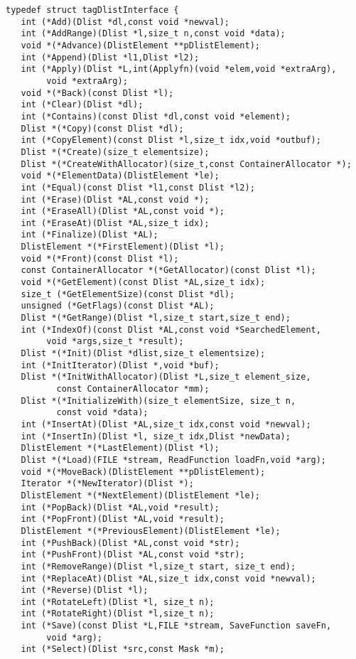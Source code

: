 \begin{verbatim}
typedef struct tagDlistInterface {
   int (*Add)(Dlist *dl,const void *newval);
   int (*AddRange)(Dlist *l,size_t n,const void *data);
   void *(*Advance)(DlistElement **pDlistElement);
   int (*Append)(Dlist *l1,Dlist *l2);
   int (*Apply)(Dlist *L,int(Applyfn)(void *elem,void *extraArg),
        void *extraArg);
   void *(*Back)(const Dlist *l);
   int (*Clear)(Dlist *dl);
   int (*Contains)(const Dlist *dl,const void *element);
   Dlist *(*Copy)(const Dlist *dl);
   int (*CopyElement)(const Dlist *l,size_t idx,void *outbuf);
   Dlist *(*Create)(size_t elementsize);
   Dlist *(*CreateWithAllocator)(size_t,const ContainerAllocator *);
   void *(*ElementData)(DlistElement *le);
   int (*Equal)(const Dlist *l1,const Dlist *l2);
   int (*Erase)(Dlist *AL,const void *);
   int (*EraseAll)(Dlist *AL,const void *);
   int (*EraseAt)(Dlist *AL,size_t idx);
   int (*Finalize)(Dlist *AL);
   DlistElement *(*FirstElement)(Dlist *l);
   void *(*Front)(const Dlist *l);
   const ContainerAllocator *(*GetAllocator)(const Dlist *l);
   void *(*GetElement)(const Dlist *AL,size_t idx);
   size_t (*GetElementSize)(const Dlist *dl);
   unsigned (*GetFlags)(const Dlist *AL);
   Dlist *(*GetRange)(Dlist *l,size_t start,size_t end);
   int (*IndexOf)(const Dlist *AL,const void *SearchedElement,
        void *args,size_t *result);
   Dlist *(*Init)(Dlist *dlist,size_t elementsize);
   int (*InitIterator)(Dlist *,void *buf);
   Dlist *(*InitWithAllocator)(Dlist *L,size_t element_size,
          const ContainerAllocator *mm);
   Dlist *(*InitializeWith)(size_t elementSize, size_t n,
          const void *data);
   int (*InsertAt)(Dlist *AL,size_t idx,const void *newval);
   int (*InsertIn)(Dlist *l, size_t idx,Dlist *newData);
   DlistElement *(*LastElement)(Dlist *l);
   Dlist *(*Load)(FILE *stream, ReadFunction loadFn,void *arg);
   void *(*MoveBack)(DlistElement **pDlistElement);
   Iterator *(*NewIterator)(Dlist *);
   DlistElement *(*NextElement)(DlistElement *le);
   int (*PopBack)(Dlist *AL,void *result);
   int (*PopFront)(Dlist *AL,void *result);
   DlistElement *(*PreviousElement)(DlistElement *le);
   int (*PushBack)(Dlist *AL,const void *str);
   int (*PushFront)(Dlist *AL,const void *str);
   int (*RemoveRange)(Dlist *l,size_t start, size_t end);
   int (*ReplaceAt)(Dlist *AL,size_t idx,const void *newval);
   int (*Reverse)(Dlist *l);
   int (*RotateLeft)(Dlist *l, size_t n);
   int (*RotateRight)(Dlist *l,size_t n);
   int (*Save)(const Dlist *L,FILE *stream, SaveFunction saveFn,
        void *arg);
   int (*Select)(Dlist *src,const Mask *m);

\end{verbatim}
